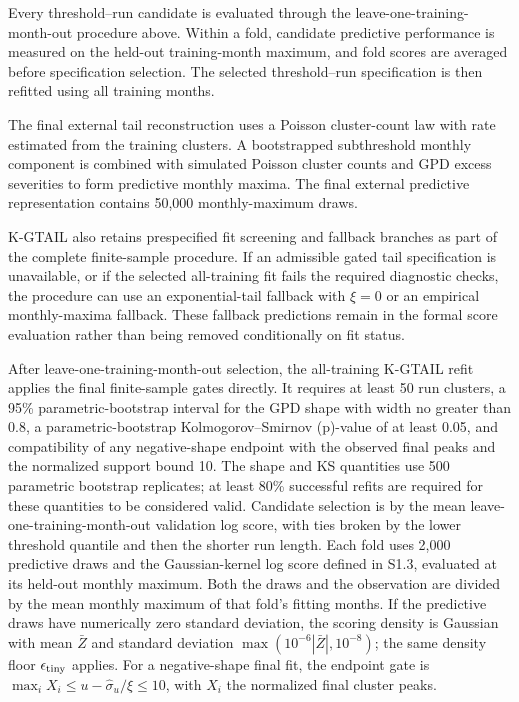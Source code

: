 \documentclass[AMA,Times1COL]{WileyNJDv5}
\begin{document}
Every threshold--run candidate is evaluated through the
leave-one-training-month-out procedure above. Within a fold, candidate
predictive performance is measured on the held-out training-month
maximum, and fold scores are averaged before specification selection.
The selected threshold--run specification is then refitted using all
training months.

The final external tail reconstruction uses a Poisson cluster-count
law with rate estimated from the training clusters. A bootstrapped
subthreshold monthly component is combined with simulated Poisson
cluster counts and GPD excess severities to form predictive monthly
maxima. The final external predictive representation contains 50,000
monthly-maximum draws.

K-GTAIL also retains prespecified fit screening and fallback branches
as part of the complete finite-sample procedure. If an admissible
gated tail specification is unavailable, or if the selected
all-training fit fails the required diagnostic checks, the procedure
can use an exponential-tail fallback with \(\xi=0\) or an empirical
monthly-maxima fallback. These fallback predictions remain in the
formal score evaluation rather than being removed conditionally on fit
status.

After leave-one-training-month-out selection, the all-training K-GTAIL
refit applies the final finite-sample gates directly. It requires at
least 50 run clusters, a 95\% parametric-bootstrap interval for the GPD
shape with width no greater than 0.8, a parametric-bootstrap
Kolmogorov--Smirnov (p)-value of at least 0.05, and compatibility of
any negative-shape endpoint with the observed final peaks and the
normalized support bound 10. The shape and KS quantities use 500
parametric bootstrap replicates; at least 80\% successful refits are
required for these quantities to be considered valid. Candidate
selection is by the mean leave-one-training-month-out validation log
score, with ties broken by the lower threshold quantile and then the
shorter run length. Each fold uses 2,000 predictive draws and the
Gaussian-kernel log score defined in S1.3, evaluated at its held-out
monthly maximum. Both the draws and the observation are divided by
the mean monthly maximum of that fold's fitting months. If the
predictive draws have numerically zero standard deviation, the scoring
density is Gaussian with mean \(\bar Z\) and standard deviation
\(\max(10^{-6}|\bar Z|,10^{-8})\); the same density floor
\(\epsilon_{\rm tiny}\) applies. For a negative-shape final fit,
the endpoint gate is \(\max_i X_i\leq u-\widehat\sigma_u/\widehat\xi
\leq10\), with \(X_i\) the normalized final cluster peaks.
\end{document}
